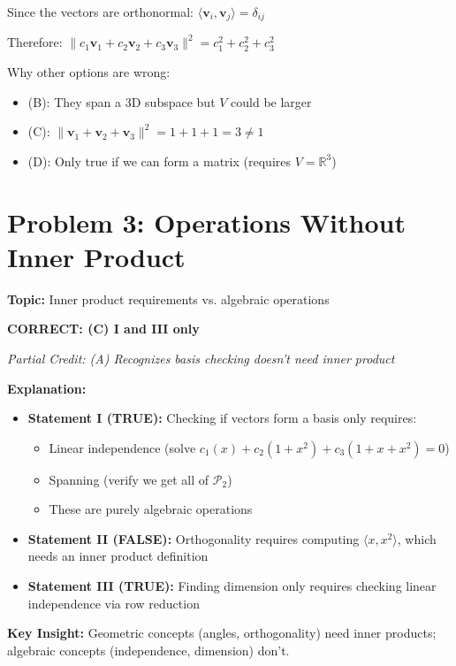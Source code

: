 \documentclass[12pt]{amsart}
\newcommand{\correct}[1]{{\color{blue}\textbf{CORRECT: #1}}}
\newcommand{\partcred}[1]{{\color{red}\textit{Partial Credit: #1}}}
\newcommand{\hint}{\textbf{Key Insight: }}
\begin{document}
Since the vectors are orthonormal: $\langle\mathbf{v}_i, \mathbf{v}_j\rangle = \delta_{ij}$

Therefore: $\|c_1\mathbf{v}_1 + c_2\mathbf{v}_2 + c_3\mathbf{v}_3\|^2 = c_1^2 + c_2^2 + c_3^2$

Why other options are wrong:
\begin{itemize}
\item (B): They span a 3D subspace but $V$ could be larger
\item (C): $\|\mathbf{v}_1 + \mathbf{v}_2 + \mathbf{v}_3\|^2 = 1 + 1 + 1 = 3 \neq 1$
\item (D): Only true if we can form a matrix (requires $V = \mathbb{R}^3$)
\end{itemize}

\hrulefill

\section*{Problem 3: Operations Without Inner Product}
\textbf{Topic:} Inner product requirements vs. algebraic operations

\correct{(C) I and III only}

\partcred{(A) Recognizes basis checking doesn't need inner product}

\textbf{Explanation:} 
\begin{itemize}
\item \textbf{Statement I (TRUE):} Checking if vectors form a basis only requires:
  \begin{itemize}
  \item Linear independence (solve $c_1(x) + c_2(1+x^2) + c_3(1+x+x^2) = 0$)
  \item Spanning (verify we get all of $\mathcal{P}_2$)
  \item These are purely algebraic operations
  \end{itemize}
\item \textbf{Statement II (FALSE):} Orthogonality requires computing $\langle x, x^2 \rangle$, which needs an inner product definition
\item \textbf{Statement III (TRUE):} Finding dimension only requires checking linear independence via row reduction
\end{itemize}

\hint Geometric concepts (angles, orthogonality) need inner products; algebraic concepts (independence, dimension) don't.

\hrulefill
\end{document}
